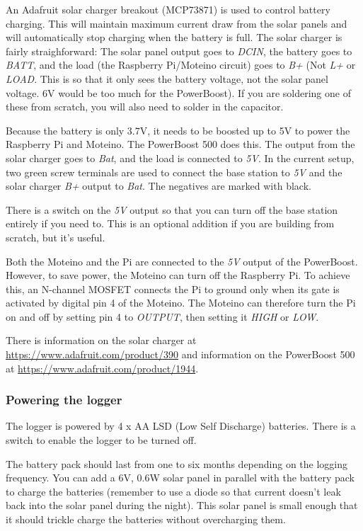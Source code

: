 \documentclass[10pt]{article}
\begin{document}
An Adafruit solar charger breakout (MCP73871) is used to control battery charging. This will maintain maximum current draw from the solar panels and will automatically stop charging when the battery is full. The solar charger is fairly straighforward: The solar panel output goes to \textit{DCIN}, the battery goes to \textit{BATT}, and the load (the Raspberry Pi/Moteino circuit) goes to \textit{B+} (Not \textit{L+} or \textit{LOAD}. This is so that it only sees the battery voltage, not the solar panel voltage. 6V would be too much for the PowerBoost). If you are soldering one of these from scratch, you will also need to solder in the capacitor.

Because the battery is only 3.7V, it needs to be boosted up to 5V to power the Raspberry Pi and Moteino. The PowerBoost 500 does this. The output from the solar charger goes to \textit{Bat}, and the load is connected to \textit{5V}. In the current setup, two green screw terminals are used to connect the base station to \textit{5V} and the solar charger \textit{B+} output to \textit{Bat}. The negatives are marked with black.

There is a switch on the \textit{5V} output so that you can turn off the base station entirely if you need to. This is an optional addition if you are building from scratch, but it's useful.

Both the Moteino and the Pi are connected to the \textit{5V} output of the PowerBoost. However, to save power, the Moteino can turn off the Raspberry Pi. To achieve this, an N-channel MOSFET connects the Pi to ground only when its gate is activated by digital pin 4 of the Moteino. The Moteino can therefore turn the Pi on and off by setting pin 4 to \textit{OUTPUT}, then setting it \textit{HIGH} or \textit{LOW}.

There is information on the solar charger at \url{https://www.adafruit.com/product/390} and information on the PowerBoost 500 at \url{https://www.adafruit.com/product/1944}.

\subsubsection{Powering the logger}

The logger is powered by 4 x AA LSD (Low Self Discharge) batteries. There is a switch to enable the logger to be turned off.

The battery pack should last from one to six months depending on the logging frequency. You can add a 6V, 0.6W solar panel in parallel with the battery pack to charge the batteries (remember to use a diode so that current doesn't leak back into the solar panel during the night). This solar panel is small enough that it should trickle charge the batteries without overcharging them.
\end{document}
